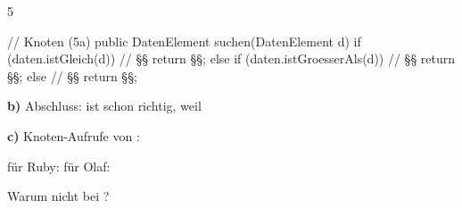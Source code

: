 \documentclass[11pt,a4paper]{article}
\begin{document}
\begin{aufgabe}{5}
\begin{minipage}[t]{0.56\linewidth}
\vspace{0pt}
\begin{javaluecke}[basicstyle=\linespread{1.5}\footnotesize\ttfamily]
// Knoten (5a)
public DatenElement suchen(DatenElement d) {
   if (daten.istGleich(d)) {           // §§
      return §§;
   } else if (daten.istGroesserAls(d)) {  // §§
      return §§;
   } else {                            // §§
      return §§;
   }
}
\end{javaluecke}
\end{minipage}\hfill
\begin{minipage}[t]{0.42\linewidth}
\vspace{0pt}\lueckentext
\textbf{b)} Abschluss:   ist schon richtig, weil\par
{}
\textbf{c)} Knoten-Aufrufe von :\par
für Ruby: \quad für Olaf: \par
Warum nicht  bei ?\par
{}
\end{minipage}
\end{aufgabe}
\end{document}
